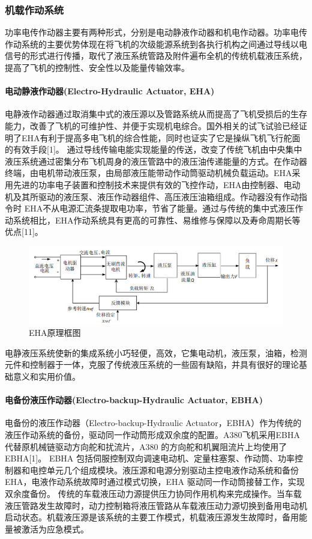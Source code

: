 \documentclass[12pt,a4paper]{report}
\begin{document}
\subsubsection{机载作动系统}
功率电传作动器主要有两种形式，分别是电动静液作动器和机电作动器。功率电传作动系统的主要优势体现在将飞机的次级能源系统到各执行机构之间通过导线以电信号的形式进行传播，取代了液压系统管路及附件遍布全机的传统机载液压系统，提高了飞机的控制性、安全性以及能量传输效率。

\paragraph{电动静液作动器(Electro-Hydraulic Actuator, EHA)}
电静液作动器通过取消集中式的液压源以及管路系统从而提高了飞机受损后的生存能力，改善了飞机的可维护性、并便于实现机电综合。国外相关的试飞试验已经证明了EHA有利于提高多电飞机的综合性能，同时也证实了它是操纵飞机飞行舵面的有效手段[1]。
通过导线传输电能实现能量的传送，改变了传统飞机由中央集中液压系统通过密集分布飞机周身的液压管路中的液压油传递能量的方式。在作动器终端，由电机带动液压泵，由局部液压能带动作动筒驱动机械负载运动。EHA采用先进的功率电子装置和控制技术来提供有效的飞控作动，EHA由控制器、电动机及其所驱动的液压泵、液压作动器组件、高压液压油箱组成。作动器没有作动指令时 EHA不从电源汇流条提取电功率，节省了能量。通过与传统的集中式液压作动系统相比，EHA作动系统具有更高的可靠性、易维修与保障以及寿命周期长等优点[11]。
 
\begin{figure}[htp]
\centering
   \includegraphics[width=.8\textwidth]{ehaprinciple.jpg}
    \caption{EHA原理框图}
    \label{fig:eha}
\end{figure}

电静液压系统使新的集成系统小巧轻便，高效，它集电动机，液压泵，油箱，检测元件和控制器于一体，克服了传统液压系统的一些固有缺陷，并具有很好的理论基础意义和实用价值。

\paragraph{电备份液压作动器(Electro-backup-Hydraulic Actuator, EBHA)}
电备份的液压作动器（Electro-backup-Hydraulic Actuator，EBHA）作为传统的液压作动系统的备份，驱动同一作动筒形成双余度的配置。A380飞机采用EBHA代替原机械链驱动方向舵和扰流片，A380 的方向舵和机翼阻流片上均使用了 EBHA[1]。
EBHA 包括伺服控制双向调速电动机、定量柱塞泵、作动筒、功率控制器和电控单元几个组成模块。液压源和电源分别驱动主控电液作动系统和备份 EHA，电液作动系统故障时通过模式切换，EHA 驱动同一作动筒接替工作，实现双余度备份。 传统的车载液压动力源提供压力协同作用机构来完成操作。当车载液压管路发生故障时，动力控制箱将液压管路从车载液压动力源切换到备用电动机启动状态。机载液压源是该系统的主要工作模式，机载液压源发生故障时，备用能量被激活为应急模式。
\end{document}
